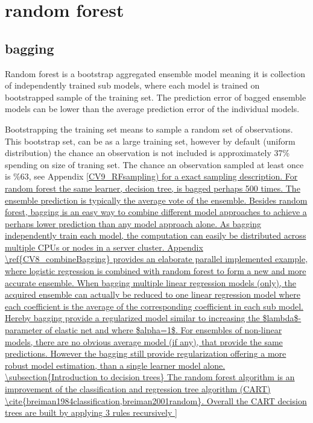 \section{random forest}

\subsection{bagging}
Random forest is a bootstrap aggregated ensemble model meaning it is collection of independently trained sub models, where each model is trained on bootstrapped sample of the training set. The prediction error of bagged ensemble models can be lower than the average prediction error of the individual models.

Bootstrapping the training set means to sample a random set of observations. This bootstrap set, can be as a large training set, however by default (uniform distribution) the chance an observation is not included is approximately 37\% spending on size of traning set. The chance an observation sampled at least once is \%63, see Appendix \ref{CV9_RFsampling) for a exact sampling description.

For random forest the same learner, decision tree, is bagged perhaps 500 times. The ensemble prediction is typically the average vote of the ensemble. Besides random forest, bagging is an easy way to combine different model approaches to achieve a perhaps lower prediction than any model approach alone. As bagging independently train each model, the computation can easily be distributed across multiple CPUs or nodes in a server cluster. Appendix \ref{CV8_combineBagging} provides an elaborate parallel implemented example, where logistic regression is combined with random forest to form a new and more accurate ensemble.

When bagging multiple linear regression models (only), the acquired ensemble can actually be reduced to one linear regression model where each coefficient is the average of the corresponding coefficient in each sub model. Hereby bagging provide a regularized model similar to increasing the $lambda$-parameter of elastic net and where $alpha=1$. For ensembles of non-linear models, there are no obvious average model (if any), that provide the same predictions. However the bagging still provide regularization offering a more robust model estimation, than a single learner model alone.


\subsection{Introduction to decision trees}
The random forest algorithm is an improvement of the classification and regression tree algorithm (CART) \cite{breiman1984classification,breiman2001random}. Overall the CART decision trees are built by applying 3 rules recursively

}
